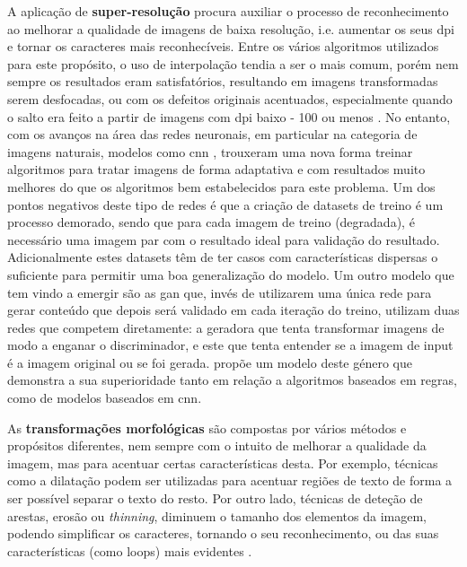 A aplicação de \textbf{super-resolução} procura auxiliar o processo de reconhecimento ao melhorar a qualidade de imagens de baixa resolução, i.e. aumentar os seus \acrshort{dpi} e tornar os caracteres mais reconhecíveis. 
Entre os vários algoritmos utilizados para este propósito, o uso de interpolação tendia a ser o mais comum, porém nem sempre os resultados eram satisfatórios, resultando em imagens transformadas serem desfocadas, ou com os defeitos originais acentuados, especialmente quando o salto era feito a partir de imagens com \acrshort{dpi} baixo - 100 ou menos \citep{8545609}. No entanto, com os avanços na área das redes neuronais, em particular na categoria de imagens naturais, modelos como \acrshort{cnn} \citep{8368720},\citep{8545609} trouxeram uma nova forma treinar algoritmos para tratar imagens de forma adaptativa e com resultados muito melhores do que os algoritmos bem estabelecidos para este problema. Um dos pontos negativos deste tipo de redes é que a criação de datasets de treino é um processo demorado, sendo que para cada imagem de treino (degradada), é necessário uma imagem par com o resultado ideal para validação do resultado. Adicionalmente estes datasets têm de ter casos com características dispersas o suficiente para permitir uma boa generalização do modelo. Um outro modelo que tem vindo a emergir são as \acrshort{gan} que, invés de utilizarem uma única rede para gerar conteúdo que depois será validado em cada iteração do treino, utilizam duas redes que competem diretamente: a geradora que tenta transformar imagens de modo a enganar o discriminador, e este que tenta entender se a imagem de input é a imagem original ou se foi gerada. \cite{9187695} propõe um modelo deste género que demonstra a sua superioridade tanto em relação a algoritmos baseados em regras, como de modelos baseados em \acrshort{cnn}.

As \textbf{transformações morfológicas} são compostas por vários métodos e propósitos diferentes, nem sempre com o intuito de melhorar a qualidade da imagem, mas para acentuar certas características desta. Por exemplo, técnicas como a dilatação podem ser utilizadas para acentuar regiões de texto de forma a ser possível separar o texto do resto. Por outro lado, técnicas de deteção de arestas, erosão ou \textit{thinning}, diminuem o tamanho dos elementos da imagem, podendo simplificar os caracteres, tornando o seu reconhecimento, ou das suas características (como loops) mais evidentes \citep{9791698}.

